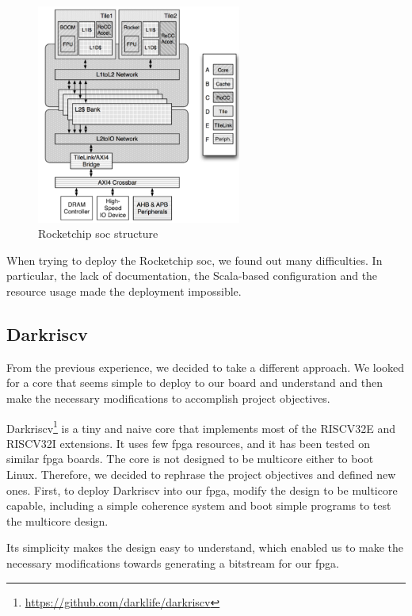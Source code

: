 \begin{figure}[h]
  \centering
  \includegraphics[width=0.6\textwidth]{images/rocket_structure.png}
  \caption{Rocketchip \gls{soc} structure}
  \label{fig:rocketstruct}
\end{figure}

When trying to deploy the Rocketchip \gls{soc}, we found out many difficulties. In particular, the lack of documentation, the Scala-based configuration and the resource usage made the deployment impossible.

\subsection{Darkriscv}
From the previous experience, we decided to take a different approach. We looked for a core that seems simple to deploy to our board and understand and then make the necessary modifications to accomplish project objectives.

Darkriscv\footnote{\url{https://github.com/darklife/darkriscv}} is a tiny and naive core that implements most of the RISCV32E and RISCV32I extensions. It uses few \gls{fpga} resources, and it has been tested on similar \gls{fpga} boards. The core is not designed to be multicore either to boot Linux. Therefore, we decided to rephrase the project objectives and defined new ones. First, to deploy Darkriscv into our \gls{fpga}, modify the design to be multicore capable, including a simple coherence system and boot simple programs to test the multicore design.

Its simplicity makes the design easy to understand, which enabled us to make the necessary modifications towards generating a bitstream for our \gls{fpga}.

